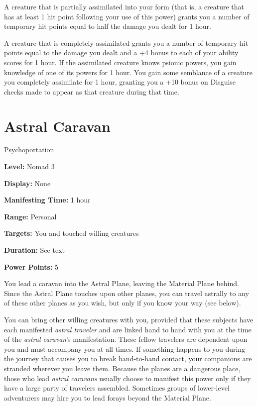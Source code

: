 \documentclass{article}
\begin{document}
A creature that is partially assimilated into your form (that is, a creature that 
has at least 1 hit point following your use of this power) grants you a number 
of temporary hit points equal to half the damage you dealt for 1 hour.

A creature that is completely assimilated grants you a number of temporary hit 
points equal to the damage you dealt and a +4 bonus to each of your ability scores 
for 1 hour. If the assimilated creature knows psionic powers, you gain knowledge 
of one of its powers for 1 hour. You gain some semblance of a creature you completely 
assimilate for 1 hour, granting you a +10 bonus on Disguise checks made to appear 
as that creature during that time.

\vspace{12pt}
\section*{Astral Caravan}

Psychoportation

\textbf{Level:} Nomad 3

\textbf{Display:} None

\textbf{Manifesting Time:} 1 hour

\textbf{Range:} Personal

\textbf{Targets:} You and touched willing creatures

\textbf{Duration:} See text

\textbf{Power Points:} 5

You lead a caravan into the Astral Plane, leaving the Material Plane behind. Since 
the Astral Plane touches upon other planes, you can travel astrally to any of these 
other planes as you wish, but only if you know your way (see below).

You can bring other willing creatures with you, provided that these subjects have 
each manifested \textit{astral traveler }and are linked hand to hand with you at 
the time of the \textit{astral caravan'}s manifestation. These fellow travelers 
are dependent upon you and must accompany you at all times. If something happens 
to you during the journey that causes you to break hand-to-hand contact, your companions 
are stranded wherever you leave them. Because the planes are a dangerous place, 
those who lead \textit{astral caravans }usually choose to manifest this power only 
if they have a large party of travelers assembled. Sometimes groups of lower-level 
adventurers may hire you to lead forays beyond the Material Plane.
\end{document}
